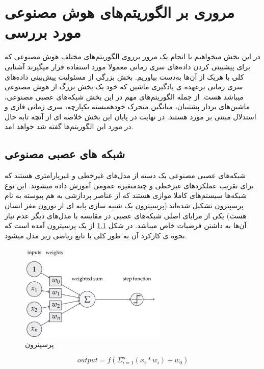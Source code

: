 \chapter{مروری بر الگوریتم‌های هوش مصنوعی مورد بررسی}

در این بخش میخواهیم با انجام یک مرور برروی الگوریتم‌های مختلف هوش مصنوعی که برای پیشبینی کردن داده‌های سری زمانی
معمولا مورد استفاده قرار میگیرند آشنایی کلی با هریک از آن‌ها به‌دست بیاوریم.
بخش بزرگی از مسئولیت پیش‌بینی داده‌های سری زمانی برعهده ی یادگیری ماشین که خود یک بخش بزرگ از هوش مصنوعی میباشد هست.
از جمله الگوریتم‌های مهم در این بخش شبکه‌های عصبی مصنوعی، ماشین‌های بردار پشتیبان، میانگین متحرک خودهمبسته یکپارچه، سری زمانی فازی و استدلال مبتنی بر مورد هستند. 
در نهایت در پایان این بخش خلاصه ای از آنچه تابه حال در مورد این الگوریتم‌ها گفته شد خواهد امد.

\section{شبکه های عصبی مصنوعی}

شبکه‌های عصبی مصنوعی یک دسته از مدل‌های غیر‌خطی و غیر‌پارامتری هستند که برای تقریب عملکرد‌های غیر‌خطی و چند‌متغیره عمومی آموزش داده میشوند. 
این نوع شبکه‌ها سیستم‌های کاملا موازی هستند که از عناصر پردازشی به هم پیوسته به نام پرسپترون تشکیل شده‌اند.(پرسپترون یک شبیه سازی پایه ای از نورون مغز انسان هست)
یکی از مزایای اصلی شبکه‌های عصبی در مقایسه با مدل‌های دیگر عدم نیاز آن‌ها به داشتن فرضیات خاص میباشد.
در شکل \ref{fig:perceptron} از یک پرسپترون آمده است که نحوه ی کارکرد آن به طور کلی با تابع ریاضی زیر مدل میشود.

\begin{figure}[ht!]
    \begin{center}
        \includegraphics[width=7cm]{images/perceptron.png}
    \end{center}
    \caption[پرسپترون]{پرسپترون}
    \label{fig:perceptron}
    \end{figure}

\begin{equation}\label{eq:perceptron}
    output = f(\Sigma_{i = 1}^{n}(x_i*w_i) + w_0)
\end{equation}

